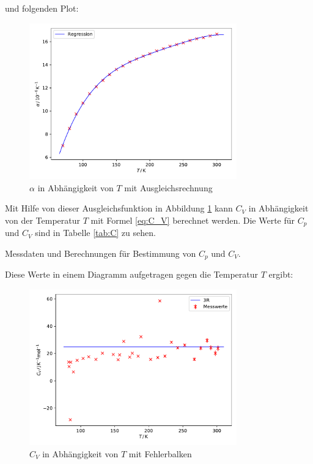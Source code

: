 und folgenden Plot:

\begin{figure}[H]
    \centering
    \includegraphics[width=0.8\textwidth]{build/alpha.pdf}
    \caption{$\alpha$ in Abhängigkeit von $T$ mit Ausgleichsrechnung}
    \label{fig:alpha_plot}
\end{figure}

Mit Hilfe von dieser Ausgleichsfunktion in Abbildung \ref{fig:alpha_plot} kann $C_V$ in Abhängigkeit von der Temperatur $T$ mit Formel \eqref{eq:C_V} berechnet werden. Die Werte für $C_p$ und $C_V$ sind in Tabelle \ref{tab:C} zu sehen.

\begin{table}
    \centering
    \caption{Messdaten und Berechnungen für Bestimmung von $C_p$ und $C_V$. }
    \label{tab:C}
\end{table}
Diese Werte in einem Diagramm aufgetragen gegen die Temperatur $T$ ergibt:

\begin{figure}[H]
    \centering
    \includegraphics[width=0.8\textwidth]{build/C_V.pdf}
    \caption{$C_V$ in Abhängigkeit von $T$ mit Fehlerbalken}
    \label{fig:C_V}
\end{figure}


